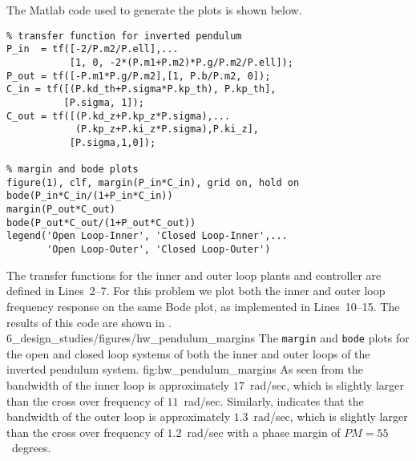 
The Matlab code used to generate the plots is shown below.
\begin{lstlisting}
% transfer function for inverted pendulum
P_in  = tf([-2/P.m2/P.ell],...
           [1, 0, -2*(P.m1+P.m2)*P.g/P.m2/P.ell]);
P_out = tf([-P.m1*P.g/P.m2],[1, P.b/P.m2, 0]);
C_in = tf([(P.kd_th+P.sigma*P.kp_th), P.kp_th], 
          [P.sigma, 1]);
C_out = tf([(P.kd_z+P.kp_z*P.sigma),...
            (P.kp_z+P.ki_z*P.sigma),P.ki_z],
           [P.sigma,1,0]);

% margin and bode plots 
figure(1), clf, margin(P_in*C_in), grid on, hold on
bode(P_in*C_in/(1+P_in*C_in)) 
margin(P_out*C_out)
bode(P_out*C_out/(1+P_out*C_out))
legend('Open Loop-Inner', 'Closed Loop-Inner',...
       'Open Loop-Outer', 'Closed Loop-Outer')

\end{lstlisting}

The transfer functions for the inner and outer loop plants and controller are defined in Lines~2--7.  For this problem we plot both the inner and outer loop frequency response on the same Bode plot, as implemented in Lines~10--15. The results of this code are shown in .
	{6_design_studies/figures/hw_pendulum_margins}
	{The {\tt margin} and {\tt bode} plots for the open and closed loop systems of both the inner and outer loops of the inverted pendulum system.}
	{fig:hw_pendulum_margins}
As seen from  the bandwidth of the inner loop is approximately $17$~rad/sec, which is slightly larger than the cross over frequency of $11$~rad/sec.  
%
Similarly,  indicates that the bandwidth of the outer loop is approximately $1.3$~rad/sec, which is slightly larger than the cross over frequency of $1.2$~rad/sec with a phase margin of $PM=55$~degrees.

